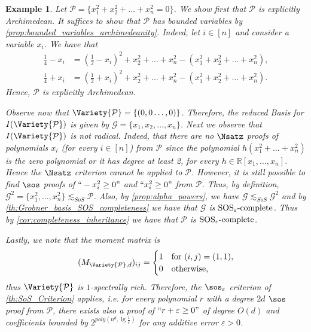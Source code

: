 \documentclass[11pt]{article}
\newtheorem{example}[theorem]{Example}
\newcommand{\SOSe}{\rm{SOS}_\varepsilon\text{-complete}}
\begin{document}
\begin{example}\label{ex:separation2}
    Let $\mathcal{P} = \{ x_1^2 + x_2^2 + \ldots + x_n^2 =0\} $. We show first that $\mathcal{P}$ is explicitly Archimedean. It suffices to show that $\mathcal{P}$ has bounded variables by \cref{prop:bounded_variables_archimedeanity}. Indeed, let $i \in [n]$ and consider a variable $x_i$. We have that 
    \begin{align*}
        \frac{1}{4} - x_i &= \left(\frac{1}{2} - x_i\right)^2 + x_2^2 + \dots + x_n^2 - (x_1^2 + x_2^2 + \dots + x_n^2), \\
        \frac{1}{4} + x_i &= \left(\frac{1}{2} + x_i\right)^2 + x_2^2 + \dots + x_n^2 - (x_1^2 + x_2^2 + \dots + x_n^2).
    \end{align*}
    Hence, $\mathcal{P}$ is explicitly Archimedean.
    
     Observe now that $\Variety{\mathcal{P}} = \{(0,0 \ldots, 0)\}$. Therefore, the reduced \GB Basis for $I(\Variety{\mathcal{P}})$ is given by $\mathcal{G} = \{ x_1, x_2, \ldots, x_n \}$. Next we observe that $I(\Variety{\mathcal{P}})$ is not radical. Indeed, that there are no $\Nsatz$ proofs of polynomials $x_i$ (for every $i \in [n]$) from $\mathcal{P}$ since the polynomial $h(x_1^2 + \dots + x_n^2)$ is the zero polynomial or it has degree at least 2, for every $h\in \mathbb{R}[x_1, \dots, x_n]$. Hence the $\Nsatz$ criterion cannot be applied to $\mathcal{P}$. However, it is still possible to find $\sos$ proofs of $``-x_i^2 \geq 0"$ and $``x_i^2 \geq 0"$ from $\mathcal{P}$. Thus, by definition, $\mathcal{G}^2 = \{x_1^2, \dots, x_n^2\} \lesssim_{SoS} \mathcal{P}$. Also, by \cref{prop:alpha_powers}, we have  $\mathcal{G} \lesssim_{SoS} \mathcal{G}^2$ and by \cref{th:Grobner_basis_SOS_completeness} we have that $\mathcal{G}$ is $\SOSe$. Thus by \cref{cor:completeness_inheritance} we have that $\mathcal{P}$ is $\SOSe$.

    Lastly, we note that the moment matrix is
    \begin{align*}
        (M_{\Variety{\mathcal{P}},d})_{ij} = \begin{cases}
            1 & \text{for } (i,j) = (1,1), \\
            0 & \text{otherwise}, \\
        \end{cases}
    \end{align*}
    thus $\Variety{\mathcal{P}}$ is $1$-spectrally rich. Therefore, the $\sos_{\varepsilon}$ criterion of \cref{th:SoS_Criterion} applies, i.e. for every polynomial $r$ with a degree $2d$ $\sos$ proof from $\mathcal{P}$, there exists also a proof of $``r + \varepsilon \geq 0"$ of degree $O(d)$ and coefficients bounded by $2^ {poly(n^d,\lg \frac{1}{\varepsilon})}$ for any additive error $\varepsilon > 0$.
\end{example}
\end{document}
